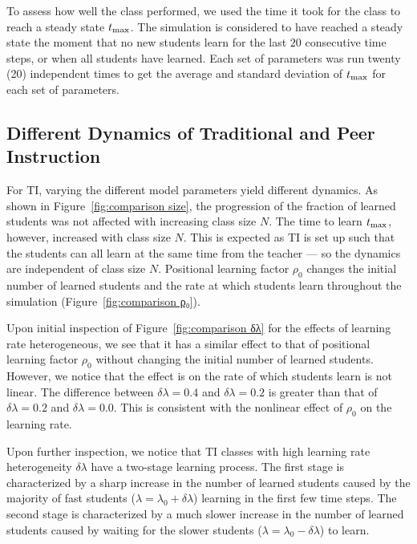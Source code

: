 \documentclass[twocolumn,secnumarabic,amssymb, nobibnotes, aps, prd]{revtex4-2}
\begin{document}
    To assess how well the class performed, we used the time it took for the class to reach a steady state $t_{\rm max}$.
    The simulation is considered to have reached a steady state the moment that no new students learn for the last $20$ consecutive time steps, or when all students have learned.
    Each set of parameters was run twenty (20) independent times to get the average and standard deviation of $t_{\rm max}$ for each set of parameters.

    \subsection{Different Dynamics of Traditional and Peer Instruction}
        
        For TI, varying the different model parameters yield different dynamics.
        As shown in Figure~\ref{fig:comparison size}, the progression of the fraction of learned students was not affected with increasing class size $N$.
        The time to learn $t_{\rm max}$, however, increased with class size $N$.
        This is expected as TI is set up such that the students can all learn at the same time from the teacher --- so the dynamics are independent of class size $N$.
        Positional learning factor $\rho_0$ changes the initial number of learned students and the rate at which students learn throughout the simulation (Figure~\ref{fig:comparison ρ₀}).
        
        Upon initial inspection of Figure~\ref{fig:comparison δλ} for the effects of learning rate heterogeneous, we see that it has a similar effect to that of positional learning factor $\rho_0$ without changing the initial number of learned students.
        However, we notice that the effect is on the rate of which students learn is not linear.
        The difference between $\delta\lambda=0.4$ and $\delta\lambda=0.2$ is greater than that of $\delta\lambda=0.2$ and $\delta\lambda=0.0$.
        This is consistent with the nonlinear effect of $\rho_0$ on the learning rate.
        
        Upon further inspection, we notice that TI classes with high learning rate heterogeneity $\delta\lambda$ have a two-stage learning process.
        The first stage is characterized by a sharp increase in the number of learned students caused by the majority of fast students ($\lambda=\lambda_0 + \delta\lambda$) learning in the first few time steps.
        The second stage is characterized by a much slower increase in the number of learned students caused by waiting for the slower students ($\lambda=\lambda_0 - \delta\lambda$) to learn.
        
\end{document}
